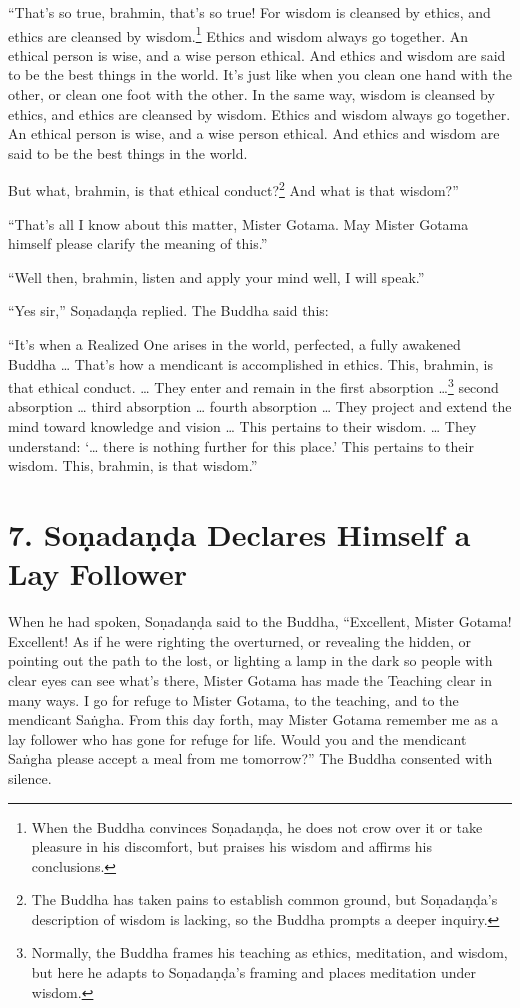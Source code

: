 \documentclass[12pt,openany]{book}%
\begin{document}
“That’s so true, brahmin, that’s so true! For wisdom is cleansed by ethics, and ethics are cleansed by wisdom.\footnote{When the Buddha convinces \textsanskrit{Soṇadaṇḍa}, he does not crow over it or take pleasure in his discomfort, but praises his wisdom and affirms his conclusions. } Ethics and wisdom always go together. An ethical person is wise, and a wise person ethical. And ethics and wisdom are said to be the best things in the world. It’s just like when you clean one hand with the other, or clean one foot with the other. In the same way, wisdom is cleansed by ethics, and ethics are cleansed by wisdom. Ethics and wisdom always go together. An ethical person is wise, and a wise person ethical. And ethics and wisdom are said to be the best things in the world. 

But what, brahmin, is that ethical conduct?\footnote{The Buddha has taken pains to establish common ground, but \textsanskrit{Soṇadaṇḍa}’s description of wisdom is lacking, so the Buddha prompts a deeper inquiry. } And what is that wisdom?” 

“That’s all I know about this matter, Mister Gotama. May Mister Gotama himself please clarify the meaning of this.” 

“Well then, brahmin, listen and apply your mind well, I will speak.” 

“Yes sir,” \textsanskrit{Soṇadaṇḍa} replied. The Buddha said this: 

“It’s when a Realized One arises in the world, perfected, a fully awakened Buddha … That’s how a mendicant is accomplished in ethics. This, brahmin, is that ethical conduct. … They enter and remain in the first absorption …\footnote{Normally, the Buddha frames his teaching as ethics, meditation, and wisdom, but here he adapts to \textsanskrit{Soṇadaṇḍa}’s framing and places meditation under wisdom. } second absorption … third absorption … fourth absorption … They project and extend the mind toward knowledge and vision … This pertains to their wisdom. … They understand: ‘… there is nothing further for this place.’ This pertains to their wisdom. This, brahmin, is that wisdom.” 

\section*{7. \textsanskrit{Soṇadaṇḍa} Declares Himself a Lay Follower }

When he had spoken, \textsanskrit{Soṇadaṇḍa} said to the Buddha, “Excellent, Mister Gotama! Excellent! As if he were righting the overturned, or revealing the hidden, or pointing out the path to the lost, or lighting a lamp in the dark so people with clear eyes can see what’s there, Mister Gotama has made the Teaching clear in many ways. I go for refuge to Mister Gotama, to the teaching, and to the mendicant \textsanskrit{Saṅgha}. From this day forth, may Mister Gotama remember me as a lay follower who has gone for refuge for life. Would you and the mendicant \textsanskrit{Saṅgha} please accept a meal from me tomorrow?” The Buddha consented with silence. 
\end{document}
